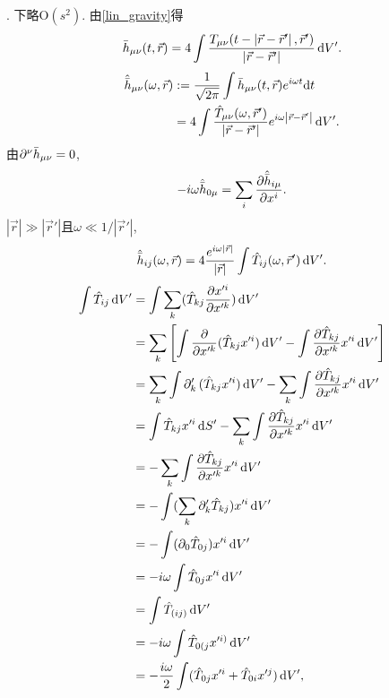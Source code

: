 \cite{Wald1984}. 下略$\text{O}(s^2)$. 由\eqref{lin_gravity}得
\begin{equation}
    \bar{h}_{\mu\nu}(t,\vec{r}) = 4\int 
    \frac{T_{\mu\nu}(t-\left\lvert\vec{r}-\vec{r}'\right\rvert,\vec{r}')}{\left\lvert\vec{r}-\vec{r}'\right\rvert}\,\mathrm{d} V'.
\end{equation}
\begin{align}
    \hat{\bar{h}}_{\mu\nu}(\omega,\vec{r})&:=\frac{1}{\sqrt{2\pi}}
    \int\bar{h}_{\mu\nu}(t,\vec{r})e^{i\omega t}\mathrm{d} t\\
    &=4\int 
    \frac{\hat{T}_{\mu\nu}(\omega,\vec{r}')}{\left\lvert\vec{r}-\vec{r}'\right\rvert}e^{i\omega\left\lvert\vec{r}-\vec{r}'\right\rvert}\,\mathrm{d} V'.
\end{align}
由$\partial^{\nu}\bar{h}_{\mu\nu}=0$,
\begin{equation}
    -i\omega\hat{\bar{h}}_{0\mu}=\sum_{i}\frac{\partial\hat{\bar{h}}_{i\mu}}{\partial x^{i}}.
\end{equation}
$\left\lvert \vec{r}\right\rvert \gg \left\lvert \vec{r}'\right\rvert$且$\omega\ll1/\left\lvert \vec{r}'\right\rvert$,
\begin{equation}
    \hat{\bar{h}}_{ij}(\omega,\vec{r}) = 4
    \frac{e^{i\omega\left\lvert\vec{r}\right\rvert}}{\left\lvert\vec{r}\right\rvert}
    \int \hat{T}_{ij}(\omega,\vec{r}')\,\mathrm{d} V'.
\end{equation}
\begin{align}
    \int \hat{T}_{ij}\,\mathrm{d} V'
    &=\int \sum_{k}(\hat{T}_{kj}\frac{\partial x'^i}{\partial x'^k})\,\mathrm{d} V'\\
    &= \sum_{k}\left[\int \frac{\partial }{\partial x'^k}(\hat{T}_{kj}x'^i)\,\mathrm{d} V'-\int \frac{\partial \hat{T}_{kj}}{\partial x'^k}x'^i\,\mathrm{d} V'\right]\\
    &= \sum_{k}\int \partial'_k\,(\hat{T}_{kj}x'^i)\,\mathrm{d} V' - \sum_{k}\int \frac{\partial \hat{T}_{kj}}{\partial x'^k}x'^i\,\mathrm{d} V'\\
    &= \int \hat{T}_{kj}x'^i\,\mathrm{d} S' - \sum_{k}\int \frac{\partial \hat{T}_{kj}}{\partial x'^k}x'^i\,\mathrm{d} V'\\
    &= -\sum_{k}\int \frac{\partial \hat{T}_{kj}}{\partial x'^k}x'^i\,\mathrm{d} V'\\
    &= -\int (\sum_{k}\partial'_k\hat{T}_{kj})x'^i\,\mathrm{d} V'\\
    &= -\int (\partial_0\hat{T}_{0j})x'^i\,\mathrm{d} V'\\
    &= -i\omega\int \hat{T}_{0j}x'^i\,\mathrm{d} V'\\
    &= \int \hat{T}_{(ij)}\,\mathrm{d} V'\\
    &= -i\omega\int \hat{T}_{0(j}x'^{i)}\,\mathrm{d} V'\\
    &= -\frac{i\omega}{2}\int (\hat{T}_{0j}x'^{i}+\hat{T}_{0i}x'^{j})\,\mathrm{d} V',
\end{align}
